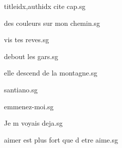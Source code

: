 \documentclass[
    ]{article}
\begin{document}
\begin{songs}{titleidx,authidx}
{cite cap.sg}


{des couleurs sur mon chemin.sg}


{vis tes reves.sg}


{debout les gars.sg}


{elle descend de la montagne.sg}


{santiano.sg}


{emmenez-moi.sg}


{Je m voyais deja.sg}


{aimer est plus fort que d etre aime.sg}



\end{songs}
\end{document}

